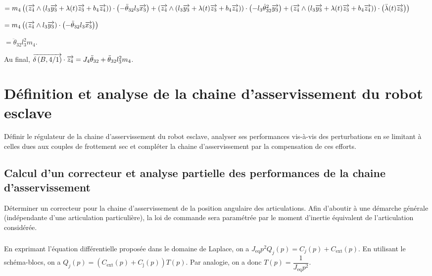 \documentclass[10pt,fleqn]{article} %
\begin{document}
$= m_4\left(\left( \overrightarrow{z_4} \wedge  \left(l_3 \overrightarrow{y_3} + \lambda(t) \overrightarrow{z_3}+ b_4 \overrightarrow{z_4}\right)  \right) \cdot  \left(-\ddot{\theta}_{32}l_3\overrightarrow{x_3}\right)
 + \left(\overrightarrow{z_4} \wedge \left(l_3 \overrightarrow{y_3} + \lambda(t) \overrightarrow{z_3}+ b_4 \overrightarrow{z_4}\right)  \right) \cdot \left(-l_3   \dot{\theta}_{32}^2  \overrightarrow{y_3}\right)
  +\left( \overrightarrow{z_4} \wedge \left(l_3 \overrightarrow{y_3} + \lambda(t) \overrightarrow{z_3}+ b_4 \overrightarrow{z_4}\right) \right) \cdot   \left(\ddot{\lambda}(t)\overrightarrow{z_3}\right) \right)$
  
  $= m_4\left(\left( \overrightarrow{z_4} \wedge  l_3 \overrightarrow{y_3}  \right) \cdot  \left(-\ddot{\theta}_{32}l_3\overrightarrow{x_3}\right)   \right)$

  $= \ddot{\theta}_{32}l_3^2 m_4 $.
  
  Au final,  $\overrightarrow{\delta \left( {B}, {4} /{1}\right)}\cdot\overrightarrow{z_4} = J_4 \ddot{\theta}_{32}+\ddot{\theta}_{32}l_3^2 m_4 $.


\subparagraph{}%

\subparagraph{}%

\subparagraph{}%

\section{Définition et analyse de la chaine d’asservissement du robot esclave}
\begin{obj}
Définir le régulateur de la chaine d’asservissement du robot esclave, analyser ses performances vis-à-vis
des perturbations en se limitant à celles dues aux couples de frottement sec et compléter la chaine
d’asservissement par la compensation de ces efforts.
\end{obj}

\subsection{Calcul d’un correcteur et analyse partielle des performances de la chaine d’asservissement}
\begin{obj}
Déterminer un correcteur pour la chaine d’asservissement de la position angulaire des articulations.
Afin d’aboutir à une démarche générale (indépendante d’une articulation particulière), la loi de commande
sera paramétrée par le moment d’inertie équivalent de l’articulation considérée.
\end{obj}

\subparagraph{}%
En exprimant l'équation différentielle proposée dans le domaine de Laplace, on a 
$J_{\text{eq}} p^2{Q}_j(p)=C_j(p)+C_{\text{ext}}(p)$.
En utilisant le schéma-blocs, on a $Q_j(p)=\left(C_{\text{ext}}(p)+C_{\text{j}}(p)\right)T(p)$. 
Par analogie, on a donc $T(p)=\dfrac{1}{J_{\text{eq}}p^2}$.
\end{document}

